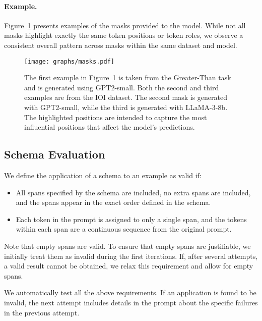 \paragraph{Example.}  Figure~\ref{fig:masks} presents examples of the masks provided to the model. While not all masks highlight exactly the same token positions or token roles, we observe a consistent overall pattern across masks within the same dataset and model.
\begin{figure}[ht]
    \centering
    \texttt{[image: graphs/masks.pdf]}
    \caption{
The first example in Figure~\ref{fig:masks} is taken from the Greater-Than task and is generated using GPT2-small. Both the second and third examples are from the IOI dataset. The second mask is generated with GPT2-small, while the third is generated with LLaMA-3-8b. The highlighted positions are intended to capture the most influential positions that affect the model's predictions. }
    \label{fig:masks}
\end{figure}

\subsection{Schema Evaluation} 
\label{ap:schema-validation}

We define the application of a schema to an example as valid if:

\begin{itemize}
    \item All spans specified by the schema are included, no extra spans are included, and the spans appear in the exact order defined in the schema.
    \item Each token in the prompt is assigned to only a single span, and the tokens within each span are a continuous sequence from the original prompt.
\end{itemize}
    
Note that empty spans are valid. To ensure that empty spans are justifiable, we initially treat them as invalid during the first iterations. If, after several attempts, a valid result cannot be obtained, we relax this requirement and allow for empty spans.

We automatically test all the above requirements. If an application is found to be invalid, the next attempt includes details in the prompt about the specific failures in the previous attempt.

